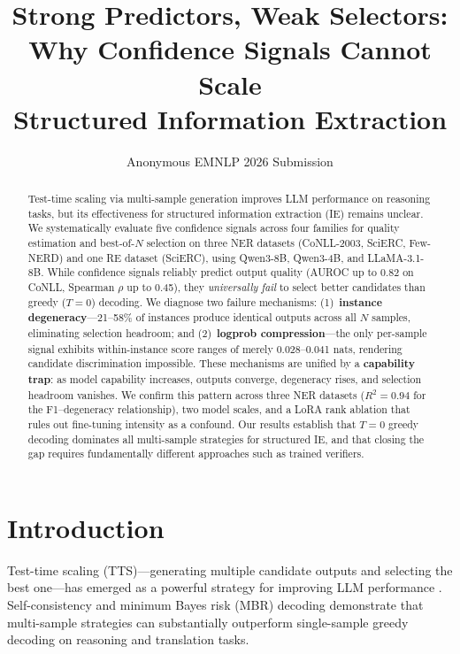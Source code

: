 \documentclass[11pt,twocolumn]{article}
\title{Strong Predictors, Weak Selectors:\\Why Confidence Signals Cannot Scale\\Structured Information Extraction}
\author{Anonymous EMNLP 2026 Submission}
\date{}
\begin{document}
\maketitle

\begin{abstract}
Test-time scaling via multi-sample generation improves LLM performance on reasoning tasks, but its effectiveness for structured information extraction (IE) remains unclear.
We systematically evaluate five confidence signals across four families for quality estimation and best-of-$N$ selection on three NER datasets (CoNLL-2003, SciERC, Few-NERD) and one RE dataset (SciERC), using Qwen3-8B, Qwen3-4B, and LLaMA-3.1-8B.
While confidence signals reliably predict output quality (AUROC up to 0.82 on CoNLL, Spearman $\rho$ up to 0.45), they \emph{universally fail} to select better candidates than greedy ($T{=}0$) decoding.
We diagnose two failure mechanisms: (1)~\textbf{instance degeneracy}---21--58\% of instances produce identical outputs across all $N$ samples, eliminating selection headroom; and (2)~\textbf{logprob compression}---the only per-sample signal exhibits within-instance score ranges of merely 0.028--0.041 nats, rendering candidate discrimination impossible.
These mechanisms are unified by a \textbf{capability trap}: as model capability increases, outputs converge, degeneracy rises, and selection headroom vanishes.
We confirm this pattern across three NER datasets ($R^2{=}0.94$ for the F1--degeneracy relationship), two model scales, and a LoRA rank ablation that rules out fine-tuning intensity as a confound.
Our results establish that $T{=}0$ greedy decoding dominates all multi-sample strategies for structured IE, and that closing the gap requires fundamentally different approaches such as trained verifiers.
\end{abstract}

\section{Introduction}
\label{sec:intro}

Test-time scaling (TTS)---generating multiple candidate outputs and selecting the best one---has emerged as a powerful strategy for improving LLM performance \citep{wang2023selfconsistency,snell2024scaling,brown2024large}.
Self-consistency \citep{wang2023selfconsistency} and minimum Bayes risk (MBR) decoding \citep{eikema2022sampling} demonstrate that multi-sample strategies can substantially outperform single-sample greedy decoding on reasoning and translation tasks.
\end{document}
